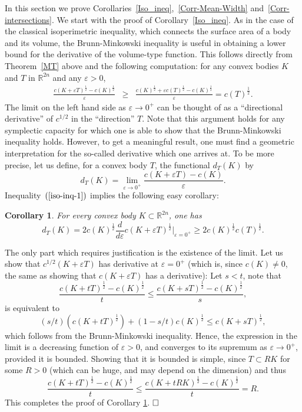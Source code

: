 \documentclass[12pt]{article}
\newtheorem{corollary}[lemma]{Corollary}
\def\eps{\varepsilon}
\begin{document}
In this section we prove
Corollaries~\ref{Iso_ineq},~\ref{Corr-Mean-Width}
and~\ref{Corr-intersections}. We start with the proof of
Corollary~\ref{Iso_ineq}. As in the case of the classical
isoperimetric inequality, which connects the surface area of a body
and its volume, the Brunn-Minkowski inequality is useful in
obtaining a lower bound for the derivative of the volume-type
function. This follows directly from Theorem~\ref{MT} above and the
following computation: for any convex bodies $K$ and $T$ in
${\mathbb R}^{2n}$ and any $\eps>0$,
\begin{eqnarray} \label{iso-inq-1}
\frac{c (K+\eps T)^{\frac 1 2} - c(K)^{\frac 1 2}}{\eps} &\ge&
\frac{c(K)^{\frac 1 2}+\eps c(T)^{\frac 1 2} - c(K)^{\frac 1
2}}{\eps} = c(T)^{\frac 1 2}.
\end{eqnarray}
The limit on the left hand side as $\eps \to 0^+$ can be thought of
as a ``directional derivative'' of $c^{1/2}$ in the ``direction''
$T$. Note that this argument holds for any symplectic capacity for
which one is able to show that the Brunn-Minkowski inequality holds.
However, to get a meaningful result, one must find a geometric
interpretation for the so-called derivative which one arrives at.
To be more precise, let us define, for a convex body $T$, the
functional $d_T(K)$ by
%
\[ d_T(K) = \lim_{\varepsilon \rightarrow
0^+} \frac{c (K+\eps T) - c(K)}{\eps}.\]
%
Inequality~$(\ref{iso-inq-1})$ implies the following easy corollary:
\begin{corollary}\label{dee} For every convex body $K \subset {\mathbb R}^{2n}$, one has
\[ d_T(K) = 2c(K)^{\frac 1 2} {\frac d {d \varepsilon}}
c(K+\varepsilon T)^{\frac 1 2}|_{\eps = 0^+} \geq 2 c(K)^{\frac 1
2}c(T)^{\frac 1 2}.\]
\end{corollary}
The only part which requires justification is the existence of the
limit. Let us show that $c^{1/2}(K+\eps T)$ has derivative at $\eps
= 0^+$ (which is, since $c(K)\neq 0$, the same as showing that
$c(K+\eps T)$ has a derivative): Let $s<t$, note that
\[ \frac{c(K+ tT)^{\frac 1 2} - {c(K)^{\frac 1 2}}}{t} \le
\frac{c(K+ sT)^{\frac 1 2} - {c(K)^{\frac 1 2}}}{s},
\]
is equivalent to
 \[ (s/t)(c(K+ tT)^{\frac 1 2}) + (1 - s/t)c
(K)^{\frac 1 2} \le  c(K+ sT)^{\frac 1 2}, \]
%
which follows from the Brunn-Minkowski inequality. Hence, the
expression in the limit is a decreasing function of $\eps>0$, and
converges to its supremum as $\eps \to 0^+$, provided it is bounded.
Showing that it is bounded is simple, since $T\subset R K$ for some
$R>0$ (which can be huge, and may depend on the dimension) and thus
\[ \frac{c(K+ tT)^{\frac 1 2} - {c(K)^{\frac 1 2}}}{t}
\le  \frac{c (K+ tRK)^{\frac 1 2} - {c (K)^{\frac 1 2}}}{t}  = R.\] This
completes the proof of Corollary \ref{dee}. $\hfill \square$
\end{document}
